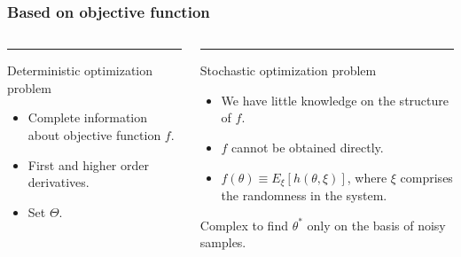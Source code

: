\begin{frame}
\frametitle{\centering Based on  objective function}
\begin{small}
\begin{columns}[T]
\begin{column}{.48\textwidth}
\color{red}\rule{\linewidth}{4pt}
Deterministic optimization problem
\begin{itemize}
\item Complete information about objective function $f$.
\item First and higher order derivatives.
\item Set $\Theta$.
\end{itemize}
\end{column}
\pause
\begin{column}{.48\textwidth}
\color{blue}\rule{\linewidth}{4pt}
Stochastic optimization problem
\begin{itemize}
\item We have little knowledge on the structure of $f$.
\item $f$ cannot be obtained directly.
\item $f(\theta) \equiv E_{\xi}[h(\theta,\xi)]$, where $\xi$ comprises the randomness in the system.
\end{itemize}
Complex  to find $\theta^{*}$ only on the basis of noisy samples.
\end{column}
\end{columns}
\end{small}
\end{frame}



